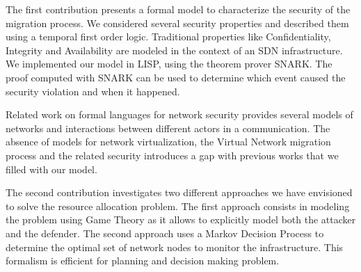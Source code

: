 The first contribution presents a formal model to characterize the security of the migration process. We considered several security properties and described them using a temporal first order logic. Traditional properties like Confidentiality, Integrity and Availability are modeled in the context of an SDN infrastructure.
We implemented our model in LISP, using the theorem prover SNARK.
The proof computed with SNARK can be used to determine which event caused the security violation and when it happened.

Related work on formal languages for network security provides several models of networks and interactions between different actors in a communication. The absence of models for network virtualization, the Virtual Network migration process and the related security introduces a gap with previous works that we filled with our model. 

The second contribution investigates two different approaches we have envisioned to solve the resource allocation problem. The first approach consists in modeling the problem using Game Theory as it allows to explicitly model both the attacker and the defender. The second approach uses a Markov Decision Process to determine the optimal set of network nodes to monitor the infrastructure. This formalism is efficient for planning and decision making problem.


